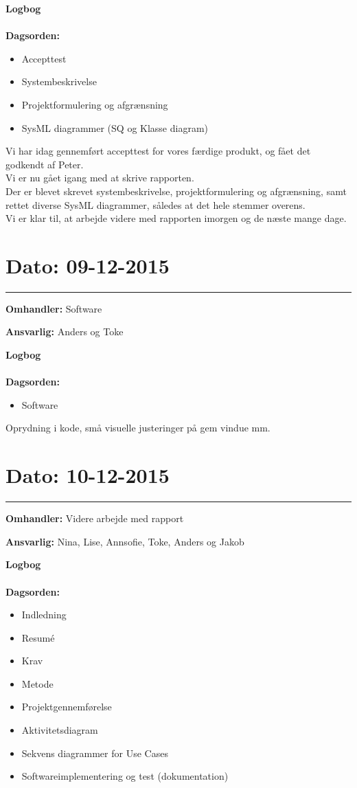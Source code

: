 \textbf{Logbog}
\\
\\
\textbf{Dagsorden:}
\begin{itemize}
	\item Accepttest
	\item Systembeskrivelse
	\item Projektformulering og afgrænsning
	\item SysML diagrammer (SQ og Klasse diagram)
\end{itemize}

Vi har idag gennemført accepttest for vores færdige produkt, og fået det godkendt af Peter. \\
Vi er nu gået igang med at skrive rapporten.\\
Der er blevet skrevet systembeskrivelse, projektformulering og afgrænsning, samt rettet diverse SysML diagrammer, således at det hele stemmer overens. \\
Vi er klar til, at arbejde videre med rapporten imorgen og de næste mange dage. 


	
\section{Dato: 09-12-2015 }
\hrule

\textbf{Omhandler:} Software

\textbf{Ansvarlig:} Anders og Toke

\textbf{Logbog}
\\
\\
\textbf{Dagsorden:}
\begin{itemize}
	\item Software
\end{itemize}


Oprydning i kode, små visuelle justeringer på gem vindue mm.


	
\section{Dato: 10-12-2015 }
\hrule

\textbf{Omhandler:} Videre arbejde med rapport

\textbf{Ansvarlig:} Nina, Lise, Annsofie, Toke, Anders og Jakob

\textbf{Logbog}
\\
\\
\textbf{Dagsorden:}
\begin{itemize}
	\item Indledning
	\item Resumé
	\item Krav
	\item Metode
	\item Projektgennemførelse
	\item Aktivitetsdiagram
	\item Sekvens diagrammer for Use Cases
	\item Softwareimplementering og test (dokumentation)
\end{itemize}

